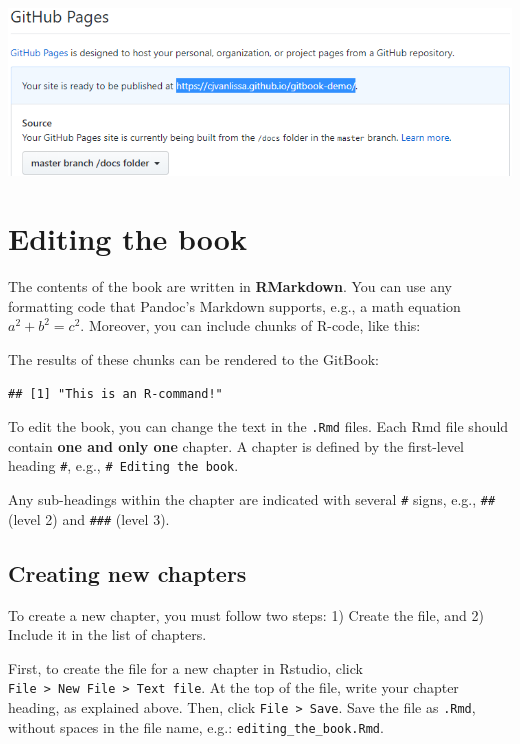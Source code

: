 \documentclass[
]{book}
\begin{document}
\begin{enumerate}
  \includegraphics{./img/pages_published.png}
\end{enumerate}

\chapter{Editing the book}\label{editing-the-book}

The contents of the book are written in \textbf{RMarkdown}. You can use any formatting code that Pandoc's Markdown supports, e.g., a math equation \(a^2 + b^2 = c^2\). Moreover, you can include chunks of R-code, like this:

The results of these chunks can be rendered to the GitBook:

\begin{verbatim}
## [1] "This is an R-command!"
\end{verbatim}

To edit the book, you can change the text in the \texttt{.Rmd} files. Each Rmd file should contain \textbf{one and only one} chapter. A chapter is defined by the first-level heading \texttt{\#}, e.g., \texttt{\#\ Editing\ the\ book}.

Any sub-headings within the chapter are indicated with several \texttt{\#} signs, e.g., \texttt{\#\#} (level 2) and \texttt{\#\#\#} (level 3).

\section{Creating new chapters}\label{creating-new-chapters}

To create a new chapter, you must follow two steps: 1) Create the file, and 2) Include it in the list of chapters.

First, to create the file for a new chapter in Rstudio, click \texttt{File\ \textgreater{}\ New\ File\ \textgreater{}\ Text\ file}. At the top of the file, write your chapter heading, as explained above. Then, click \texttt{File\ \textgreater{}\ Save}. Save the file as \texttt{.Rmd}, without spaces in the file name, e.g.: \texttt{editing\_the\_book.Rmd}.
\end{document}
